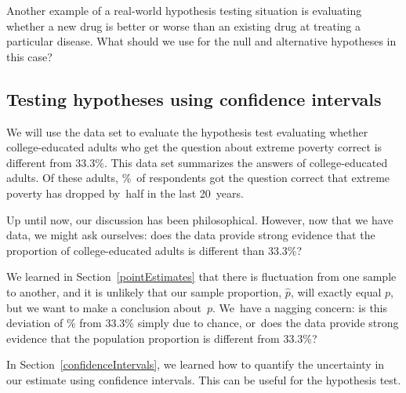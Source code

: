 \begin{exercisewrap}
\begin{nexercise}
  Another example of a real-world hypothesis testing situation
  is evaluating whether a new drug is better or worse
  than an existing drug at treating a particular disease.
  What should we use for the null and alternative hypotheses in
  this case?\footnotemark
\end{nexercise}
\end{exercisewrap}


\subsection{Testing hypotheses using confidence intervals}
\label{utilizingOurCI}


We will use the 
data set to evaluate
the hypothesis test evaluating whether college-educated adults
who get the question about extreme poverty correct is different
from 33.3\%.
This data set summarizes the answers of \roslingAsize{}
college-educated adults.
Of these \roslingAsize{} adults, \roslingApercent{}\%~of
respondents got the question correct that extreme poverty
has dropped by~half in the last 20~years.

Up until now, our discussion has been philosophical.
However, now that we have data, we might ask ourselves:
does the data provide strong evidence that the proportion
of college-educated adults is different than 33.3\%?

We learned in Section~\ref{pointEstimates} that there is
fluctuation from one sample to another, and it is unlikely
that our sample proportion, $\hat{p}$,
will exactly equal $p$, but we want to make
a conclusion about~$p$.
We~have a nagging concern:
is this deviation of \roslingApercent{}\%
from 33.3\% simply due to chance,
or~does the data provide strong evidence that the
population proportion is different from 33.3\%?

In Section~\ref{confidenceIntervals}, we learned how to
quantify the uncertainty in our estimate using confidence
intervals. This can be useful for the hypothesis test.

